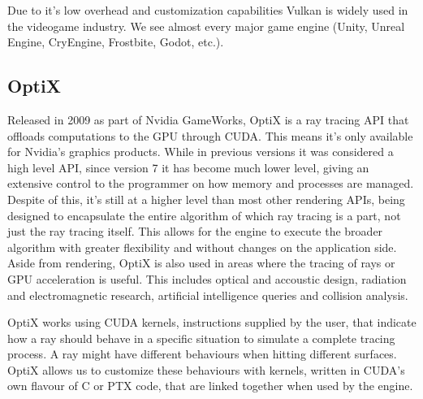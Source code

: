 Due to it's low overhead and customization capabilities Vulkan is widely used in the videogame industry. We see almost every major game engine (Unity, Unreal Engine, CryEngine, Frostbite, Godot, etc.).

\subsection{OptiX}
Released in 2009 as part of Nvidia GameWorks, OptiX is a ray tracing API that offloads computations to the GPU through CUDA. This means it's only available for Nvidia's graphics products. While in previous versions it was considered a high level API, since version 7 it has become much lower level, giving an extensive control to the programmer on how memory and processes are managed. Despite of this, it's still at a higher level than most other rendering APIs, being designed to encapsulate the entire algorithm of which ray tracing is a part, not just the ray tracing itself. This allows for the engine to execute the broader algorithm with greater flexibility and without changes on the application side. Aside from rendering, OptiX is also used in areas where the tracing of rays or GPU acceleration is useful. This includes optical and accoustic design, radiation and electromagnetic research, artificial intelligence queries and collision analysis.

OptiX works using CUDA kernels, instructions supplied by the user, that indicate how a ray should behave in a specific situation to simulate a complete tracing process. A ray might have different behaviours when hitting different surfaces. OptiX allows us to customize these behaviours with kernels, written in CUDA's own flavour of C or PTX code, that are linked together when used by the engine.

